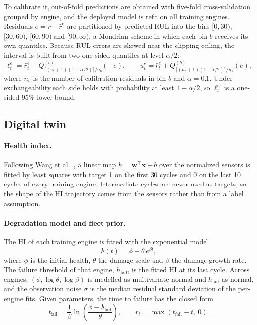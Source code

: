 \documentclass[pdflatex,sn-mathphys-num]{sn-jnl}
\begin{document}
To calibrate it, out-of-fold predictions are obtained with five-fold cross-validation grouped by engine, and the deployed model is refit on all training engines. Residuals $e = r - \hat r^{e}$ are partitioned by predicted RUL into the bins $[0,30)$, $[30,60)$, $[60,90)$ and $[90,\infty)$, a Mondrian scheme in which each bin $b$ receives its own quantiles. Because RUL errors are skewed near the clipping ceiling, the interval is built from two one-sided quantiles at level $\alpha/2$:
\begin{equation}
\ell^{e}_t = \hat r^{e}_t - Q^{(b)}_{\lceil (n_b+1)(1-\alpha/2)\rceil / n_b}(-e), \qquad
u^{e}_t = \hat r^{e}_t + Q^{(b)}_{\lceil (n_b+1)(1-\alpha/2)\rceil / n_b}(e),
\end{equation}
where $n_b$ is the number of calibration residuals in bin $b$ and $\alpha = 0.1$. Under exchangeability each side holds with probability at least $1-\alpha/2$, so $\ell^{e}_t$ is a one-sided 95\% lower bound.

\subsection{Digital twin}\label{sec:twin}
\paragraph{Health index.} Following Wang et al.~\cite{wang2008similarity}, a linear map $h = \mathbf{w}^\top \mathbf{x} + b$ over the normalized sensors is fitted by least squares with target 1 on the first 30 cycles and 0 on the last 10 cycles of every training engine. Intermediate cycles are never used as targets, so the shape of the HI trajectory comes from the sensors rather than from a label assumption.

\paragraph{Degradation model and fleet prior.} The HI of each training engine is fitted with the exponential model~\cite{gebraeel2005residual}
\begin{equation}
h(t) = \phi - \theta\, e^{\beta t},
\end{equation}
where $\phi$ is the initial health, $\theta$ the damage scale and $\beta$ the damage growth rate. The failure threshold of that engine, $h_{\mathrm{fail}}$, is the fitted HI at its last cycle. Across engines, $(\phi, \log\theta, \log\beta)$ is modelled as multivariate normal and $h_{\mathrm{fail}}$ as normal, and the observation noise $\sigma$ is the median residual standard deviation of the per-engine fits. Given parameters, the time to failure has the closed form
\begin{equation}
t_{\mathrm{fail}} = \frac{1}{\beta}\ln\!\left(\frac{\phi - h_{\mathrm{fail}}}{\theta}\right), \qquad r_t = \max(t_{\mathrm{fail}} - t,\ 0).
\end{equation}
\end{document}
